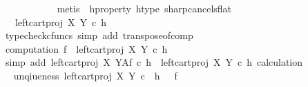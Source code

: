 \begin{isabellebody}
\ \ \ \ \ \ \ \ \ \ \isamarkupfalse%
\ {\isacharparenleft}{\kern0pt}metis\ \ h{\isacharunderscore}{\kern0pt}property{}\ h{\isacharunderscore}{\kern0pt}type\ sharp{\isacharunderscore}{\kern0pt}cancels{\isacharunderscore}{\kern0pt}flat{\isacharparenright}{\kern0pt}\isanewline
\ \ \ \ \ \ \ \ \isamarkupfalse%
\ \isamarkupfalse%
\ {\isachardoublequoteopen}{\isachardot}{\kern0pt}{\isachardot}{\kern0pt}{\isachardot}{\kern0pt}\ {\isacharequal}{\kern0pt}\ {\isacharparenleft}{\kern0pt}{\isacharparenleft}{\kern0pt}left{\isacharunderscore}{\kern0pt}cart{\isacharunderscore}{\kern0pt}proj\ X\ Y{\isacharparenright}{\kern0pt}\ {\isasymcirc}\isactrlsub c\ h\isactrlsup {\isasymflat}{\isacharparenright}{\kern0pt}\isactrlsup {\isasymsharp}{\isachardoublequoteclose}\isanewline
\ \ \ \ \ \ \ \ \ \ \isamarkupfalse%
\ {\isacharparenleft}{\kern0pt}typecheck{\isacharunderscore}{\kern0pt}cfuncs{\isacharcomma}{\kern0pt}\ simp\ add{\isacharcolon}{\kern0pt}\ transpose{\isacharunderscore}{\kern0pt}of{\isacharunderscore}{\kern0pt}comp{\isacharparenright}{\kern0pt}\isanewline
\ \ \ \ \ \ \ \ \isamarkupfalse%
\ computation{}{\isacharcolon}{\kern0pt}\ {\isachardoublequoteopen}f\ {\isacharequal}{\kern0pt}\ {\isacharparenleft}{\kern0pt}{\isacharparenleft}{\kern0pt}left{\isacharunderscore}{\kern0pt}cart{\isacharunderscore}{\kern0pt}proj\ X\ Y{\isacharparenright}{\kern0pt}\ {\isasymcirc}\isactrlsub c\ h\isactrlsup {\isasymflat}{\isacharparenright}{\kern0pt}\isactrlsup {\isasymsharp}{\isachardoublequoteclose}\isanewline
\ \ \ \ \ \ \ \ \ \ \isamarkupfalse%
\ {\isacharparenleft}{\kern0pt}simp\ add{\isacharcolon}{\kern0pt}\ {\isacartoucheopen}left{\isacharunderscore}{\kern0pt}cart{\isacharunderscore}{\kern0pt}proj\ X\ Y\isactrlbsup A\isactrlesup \isactrlsub f\ {\isasymcirc}\isactrlsub c\ h\isactrlsup {\isasymflat}\isactrlsup {\isasymsharp}\ {\isacharequal}{\kern0pt}\ {\isacharparenleft}{\kern0pt}left{\isacharunderscore}{\kern0pt}cart{\isacharunderscore}{\kern0pt}proj\ X\ Y\ {\isasymcirc}\isactrlsub c\ h\isactrlsup {\isasymflat}{\isacharparenright}{\kern0pt}\isactrlsup {\isasymsharp}{\isacartoucheclose}\ calculation{\isacharparenright}{\kern0pt}\isanewline
\ \ \ \ \ \ \ \ \isamarkupfalse%
\ \isamarkupfalse%
\ unqiueness{}{\isacharcolon}{\kern0pt}\ {\isachardoublequoteopen}{\isacharparenleft}{\kern0pt}left{\isacharunderscore}{\kern0pt}cart{\isacharunderscore}{\kern0pt}proj\ X\ Y{\isacharparenright}{\kern0pt}\ {\isasymcirc}\isactrlsub c\ \ h\isactrlsup {\isasymflat}\ {\isacharequal}{\kern0pt}\ \ f\isactrlsup {\isasymflat}{\isachardoublequoteclose}\isanewline

\end{isabellebody}
